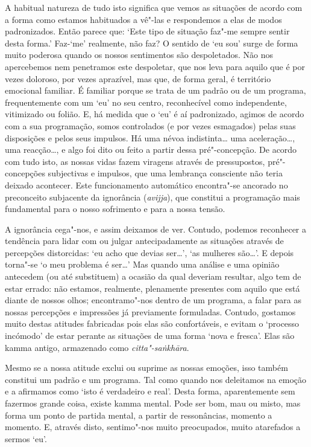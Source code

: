 A habitual natureza de
tudo isto significa que vemos as situações de acordo com a forma como estamos
habituados a vê"-las e respondemos a elas de modos padronizados. Então parece
que: `Este tipo de situação faz"-me sempre sentir desta forma.' Faz-`me'
realmente, não faz? O sentido de `eu sou' surge de forma muito poderosa quando
os nossos sentimentos são despoletados. Não nos apercebemos nem penetramos este
despoletar, que nos leva para aquilo que é por vezes doloroso, por vezes
aprazível, mas que, de forma geral, é território emocional familiar. É familiar
porque se trata de um padrão ou de um programa, frequentemente com um `eu' no
seu centro, reconhecível como independente, vitimizado ou folião. E, há medida
que o `eu' é aí padronizado, agimos de acordo com a sua programação, somos
controlados (e por vezes esmagados) pelas suas disposições e pelos seus
impulsos. Há uma névoa indistinta\ldots{} uma aceleração\ldots{}, uma reacção\ldots{}, e
algo foi dito ou feito a partir dessa pré"-concepção. De acordo com tudo isto, as
nossas vidas fazem viragens através de pressupostos, pré"-concepções subjectivas
e impulsos, que uma lembrança consciente não teria deixado acontecer. Este
funcionamento automático encontra"-se ancorado no preconceito subjacente da
ignorância (\emph{avijja}), que constitui a programação mais fundamental para o
nosso sofrimento e para a nossa tensão.

A ignorância cega"-nos, e assim deixamos de ver. Contudo, podemos reconhecer a
tendência para lidar com ou julgar antecipadamente as situações através de
percepções distorcidas: `eu acho que devias ser\ldots{}', `as mulheres são\ldots{}'.
E depois torna"-se `o meu problema é ser\ldots{}' Mas quando uma análise e uma
opinião antecedem (ou até substituem) a ocasião da qual deveriam resultar, algo
tem de estar errado: não estamos, realmente, plenamente presentes com aquilo que
está diante de nossos olhos; encontramo"-nos dentro de um programa, a falar para
as nossas percepções e impressões já previamente formuladas. Contudo, gostamos
muito destas atitudes fabricadas pois elas são confortáveis, e evitam o
`processo incómodo' de estar perante as situações de uma forma `nova e fresca'.
Elas são kamma antigo, armazenado como \emph{citta"-saṅkhāra}.

Mesmo se a nossa atitude exclui ou suprime as nossas emoções, isso também
constitui um padrão e um programa. Tal como quando nos deleitamos na emoção e a
afirmamos como `isto é verdadeiro e real'. Desta forma, aparentemente sem
fazermos grande coisa, existe kamma mental. Pode ser bom, mau ou misto, mas
forma um ponto de partida mental, a partir de ressonâncias, momento a momento.
E, através disto, sentimo"-nos muito preocupados, muito atarefados a sermos `eu'.

